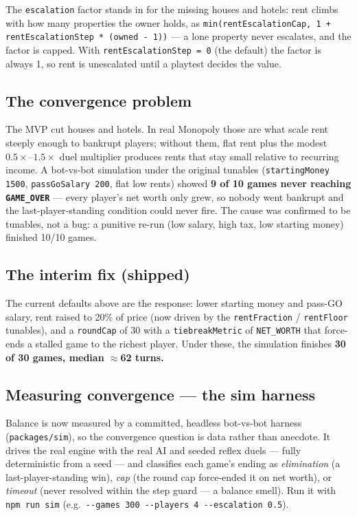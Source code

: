 \documentclass[11pt,a4paper]{article}
\newcommand{\code}[1]{\texttt{#1}}
\begin{document}
The \code{escalation} factor stands in for the missing houses and hotels: rent
climbs with how many properties the owner holds, as
\code{min(rentEscalationCap, 1 + rentEscalationStep * (owned - 1))} --- a lone
property never escalates, and the factor is capped. With
\code{rentEscalationStep = 0} (the default) the factor is always 1, so rent is
unescalated until a playtest decides the value.

\subsection{The convergence problem}
The MVP cut houses and hotels. In real Monopoly those are what scale rent
steeply enough to bankrupt players; without them, flat rent plus the modest
$0.5\times$--$1.5\times$ duel multiplier produces rents that stay small relative
to recurring income. A bot-vs-bot simulation under the original tunables
(\code{startingMoney 1500}, \code{passGoSalary 200}, flat low rents) showed
\textbf{9 of 10 games never reaching \code{GAME\_OVER}} --- every player's net
worth only grew, so nobody went bankrupt and the last-player-standing condition
could never fire. The cause was confirmed to be tunables, not a bug: a punitive
re-run (low salary, high tax, low starting money) finished 10/10 games.

\subsection{The interim fix (shipped)}
The current defaults above are the response: lower starting money and pass-GO
salary, rent raised to 20\% of price (now driven by the \code{rentFraction} /
\code{rentFloor} tunables), and a \code{roundCap} of 30 with a
\code{tiebreakMetric} of \code{NET\_WORTH} that force-ends a stalled game to the
richest player. Under these, the simulation finishes \textbf{30 of 30 games,
median $\approx$62 turns.}

\subsection{Measuring convergence --- the sim harness}
Balance is now measured by a committed, headless bot-vs-bot harness
(\code{packages/sim}), so the convergence question is data rather than anecdote.
It drives the real engine with the real AI and seeded reflex duels --- fully
deterministic from a seed --- and classifies each game's ending as
\emph{elimination} (a last-player-standing win), \emph{cap} (the round cap
force-ended it on net worth), or \emph{timeout} (never resolved within the step
guard --- a balance smell). Run it with \code{npm run sim} (e.g.\
\code{-{}-games 300 -{}-players 4 -{}-escalation 0.5}).
\end{document}
